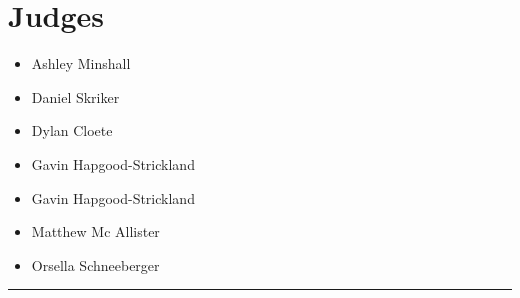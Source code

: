 \documentclass[10pt]{article}
\begin{document}
		\section*{\faUsers \: Judges}

		

	\begin{multicols}{2}

		\begin{itemize}
									\item Ashley Minshall
									\item Daniel Skriker
									\item Dylan Cloete
									\item Gavin Hapgood-Strickland
						\end{itemize}

		\vfill\null
		\columnbreak

		\begin{itemize}
									\item Gavin Hapgood-Strickland
									\item Matthew Mc Allister
									\item Orsella Schneeberger
						\end{itemize}

		\vfill\null

		\end{multicols}



			\vspace{0.5cm}
	\hrule
	\vspace{0.5cm}
\end{document}
